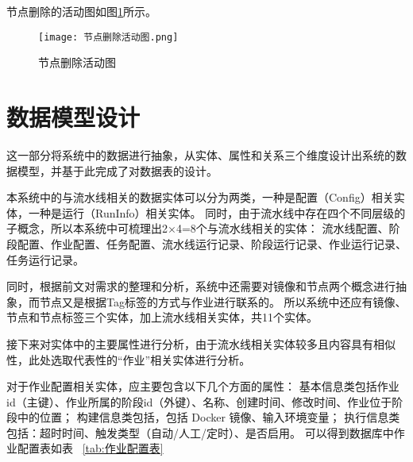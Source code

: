 节点删除的活动图如图\ref{fig:节点删除活动图}所示。

\begin{figure}[h]
  \centering
  \texttt{[image: 节点删除活动图.png]}
  \caption{节点删除活动图}
  \label{fig:节点删除活动图}
\end{figure}

\section{数据模型设计}
这一部分将系统中的数据进行抽象，从实体、属性和关系三个维度设计出系统的数据模型，并基于此完成了对数据表的设计。

本系统中的与流水线相关的数据实体可以分为两类，一种是配置（Config）相关实体，一种是运行（RunInfo）相关实体。
同时，由于流水线中存在四个不同层级的子概念，所以本系统中可梳理出2×4=8个与流水线相关的实体：
流水线配置、阶段配置、作业配置、任务配置、流水线运行记录、阶段运行记录、作业运行记录、任务运行记录。

同时，根据前文对需求的整理和分析，系统中还需要对镜像和节点两个概念进行抽象，而节点又是根据Tag标签的方式与作业进行联系的。
所以系统中还应有镜像、节点和节点标签三个实体，加上流水线相关实体，共11个实体。

接下来对实体中的主要属性进行分析，由于流水线相关实体较多且内容具有相似性，此处选取代表性的“作业”相关实体进行分析。

对于作业配置相关实体，应主要包含以下几个方面的属性：
基本信息类包括作业id（主键）、作业所属的阶段id（外键）、名称、创建时间、修改时间、作业位于阶段中的位置；
构建信息类包括，包括 Docker 镜像、输入环境变量；
执行信息类包括：超时时间、触发类型（自动/人工/定时）、是否启用。
可以得到数据库中作业配置表如表~ \ref{tab:作业配置表}

